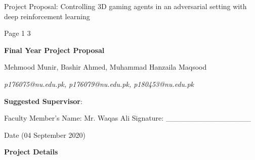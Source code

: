 \documentclass{article} %
\begin{document}
	
	\noindent Project Proposal: Controlling 3D gaming agents in an adversarial setting with deep reinforcement learning
	
	\noindent 
	
	\noindent Page 1 {\textbar} 3 \newline
	
	\noindent 
	
	\noindent \textbf{\LARGE Final Year Project Proposal}
	
	\noindent 
	
	\noindent Mehmood Munir, Bashir Ahmed, Muhammad Hanzaila Maqsood
	
	\noindent \textit{p176075@nu.edu.pk, p176079@nu.edu.pk, p180453@nu.edu.pk}
	
	\noindent \textbf{}
	
	\noindent \textbf{Suggested Supervisor}: 
	
	\noindent Faculty Member's Name: Mr. Waqas Ali 			
	\noindent \space \space \space \space \space \space \space \space\space \space\space \space \space  \space\space \space\space \space\space \space \space \space Signature:	\_\_\_\_\_\_\_\_\_\_\_\_\_\_\_\_
	
	\noindent Date (04 September 2020) 
	\newline
	\noindent
	
	\noindent \textbf{\LARGE Project Details } \newline
	
\end{document}
